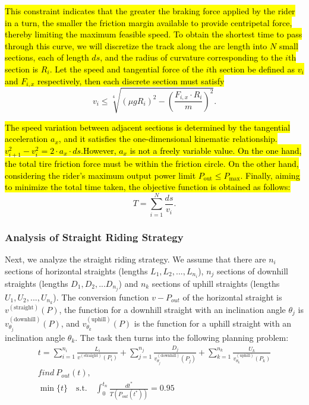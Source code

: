 \documentclass{mcmthesis}
\begin{document}
\hl{This constraint indicates that the greater the braking force applied by the rider in a turn, the smaller the friction margin available to provide centripetal force, thereby limiting the maximum feasible speed. 
To obtain the shortest time to pass through this curve, we will discretize the track along the arc length into $N$ small sections, each of length $ds$, and the radius of curvature corresponding to the $i$th section is $R_i$. 
Let the speed and tangential force of the $i$th section be defined as $v_i$ and $F_{i,x}$ respectively, then each discrete section must satisfy 
}\begin{equation}
v_i \leq
\sqrt[4]{\left( \mu g R_i \right)^2 - \left( \frac{F_{i,x}\cdot R_i}{m} \right)^2 }.
\end{equation}

\hl{The speed variation between adjacent sections is determined by the tangential acceleration $a_x$, and it satisfies the one-dimensional kinematic relationship. $
v_{i+1}^2 - v_i^2 = 2 \cdot a_x\cdot ds.
\label{eq:kinematics}
$However, $a_x$ is not a freely variable value.
On the one hand, the total tire friction force must be within the friction circle. On the other hand,
considering the rider's maximum output power limit $P_{\text{out}} \leq P_{\max}.$
Finally, aiming to minimize the total time taken, the objective function is obtained as follows:}
\begin{equation}
T = \sum_{i=1}^{N} \frac{ds}{v_i}.
\end{equation}







\subsubsection{Analysis of Straight Riding Strategy}
Next, we analyze the straight riding strategy. We assume that there are \( n_i \) sections of horizontal straights (lengths \( L_1, L_2, ..., L_{n_i} \)), \( n_j \) sections of downhill straights (lengths \( D_1, D_2, ... D_{n_j} \)) and \( n_k \) sections of uphill straights (lengths \( U_1, U_2, ..., U_{n_k} \)). The conversion function \( v - P_{out} \) of the horizontal straight is \( v^{(\text{straight})}(P) \), the function for a downhill straight with an inclination angle \( \theta_j \) is \( v_{\theta_j}^{(\text{downhill})}(P) \), and \( v_{\theta_k}^{(\text{uphill})}(P) \) is the function for a uphill straight with an inclination angle \( \theta_k \). The task then turns into the following planning problem:
\begin{equation}
\begin{gathered}
t = \sum_{i=1}^{n_i} \frac{L_i}{v^{(\text{straight})}(P_i)} + \sum_{j=1}^{n_j} \frac{D_j}{v_{\theta_j}^{(\text{downhill})}(P_j)} + \sum_{k=1}^{n_k} \frac{U_k}{v_{\theta_k}^{(\text{uphill})}(P_k)} \\
find\ P_{out}(t), \\
\min \{ t \} \quad \text{s.t.} \quad \int_0^{t_n} \frac{dt^*}{T \left( P_{out} \left( t^* \right) \right)} = 0.95
\end{gathered}
\label{eq:time_trial_optimization}
\end{equation}
\end{document}
